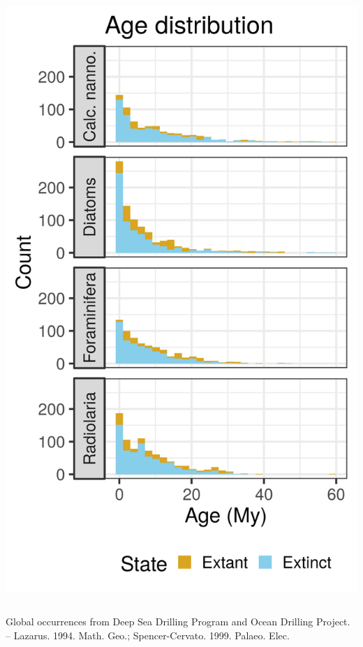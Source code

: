 \documentclass[aspectratio=169]{beamer}
\begin{document}
\begin{frame}
\begin{columns}
\begin{column}{0.4\textwidth}
      \includegraphics[width=\textwidth,height=0.7\textheight,keepaspectratio=true]{../results/figure/age_label_full}
    \end{column}
  \end{columns}

  \footnotesize{Global occurrences from Deep Sea Drilling Program and Ocean Drilling Project. -- Lazarus. 1994. Math. Geo.; Spencer-Cervato. 1999. Palaeo. Elec.}

\end{frame}
\end{document}
